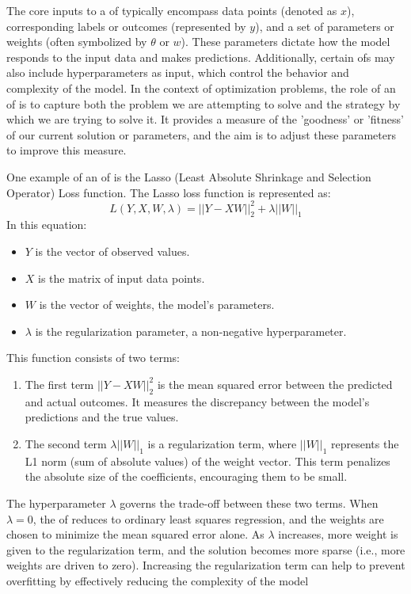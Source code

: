 \documentclass[
  a4paper,  %
  twoside,  %
  bibliography=totoc,
  headsepline,
  cleardoublepage=empty,
  parskip=half,
  draft=false
]{scrbook}
\begin{document}
The core inputs to a \gls{of} typically encompass data points (denoted as $x$), corresponding labels or outcomes (represented by $y$), and a set of parameters or weights (often symbolized by $\theta$ or $w$).
These parameters dictate how the model responds to the input data and makes predictions.
Additionally, certain \glspl{of} may also include hyperparameters as input, which control the behavior and complexity of the model.
In the context of optimization problems, the role of an \gls{of} is to capture both the problem we are attempting to solve and the strategy by which we are trying to solve it.
It provides a measure of the 'goodness' or 'fitness' of our current solution or parameters, and the aim is to adjust these parameters to improve this measure.

One example of an \gls{of} is the Lasso (Least Absolute Shrinkage and Selection Operator) Loss function.
The Lasso loss function is represented as:
\[
L(Y, X, W, \lambda) = ||Y - XW||^2_2 + \lambda ||W||_1
\]
In this equation:

\begin{itemize}
  \item \(Y\) is the vector of observed values.
  \item \(X\) is the matrix of input data points.
  \item \(W\) is the vector of weights, the model's parameters.
  \item \(\lambda\) is the regularization parameter, a non-negative hyperparameter.
\end{itemize}

This function consists of two terms:
\begin{enumerate}
  \item The first term \(||Y - XW||^2_2\) is the mean squared error between the predicted and actual outcomes.
  It measures the discrepancy between the model's predictions and the true values.
  \item The second term \(\lambda ||W||_1\) is a regularization term, where \(||W||_1\) represents the L1 norm (sum of absolute values) of the weight vector.
  This term penalizes the absolute size of the coefficients, encouraging them to be small.
\end{enumerate}
The hyperparameter \(\lambda\) governs the trade-off between these two terms.
When \(\lambda = 0\), the \gls{of} reduces to ordinary least squares regression, and the weights are chosen to minimize the mean squared error alone.
As \(\lambda\) increases, more weight is given to the regularization term, and the solution becomes more sparse (i.e., more weights are driven to zero).
Increasing the regularization term can help to prevent overfitting by effectively reducing the complexity of the model \cite{ShalevShwartz2014}
\end{document}
